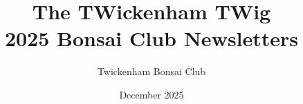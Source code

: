 \documentclass[twoside,openright]{book}
\begin{document}
    \pagestyle{empty}
    \title{%
        \vspace*{5.0em}%
        {\sffamily\Huge The \textcolor{TWRed}{TW}ickenham \textcolor{TWRed}{TW}ig}\\%
        {\sffamily\Large 2025 Bonsai Club Newsletters}\\%
        \vspace*{20.0em}%
    }
    \author{{\Large Twickenham Bonsai Club}}
    \date{December 2025}
    \maketitle
    

    \frontmatter

    

    

    \hypersetup{linkcolor=black}
    \tableofcontents
    \hypersetup{linkcolor=TWRed}

    \mainmatter
    
    
    
    
    
    
    
    
    
    
    
    
\end{document}
